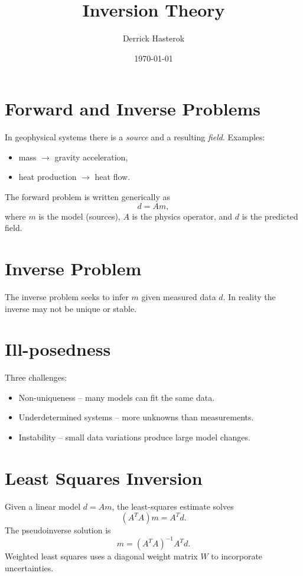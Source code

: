 \documentclass[11pt,a4paper]{article}
\title{Inversion Theory}
\author{Derrick Hasterok}
\date{\today}
\begin{document}
\maketitle

\section{Forward and Inverse Problems}
In geophysical systems there is a \emph{source} and a resulting \emph{field}. Examples:
\begin{itemize}
  \item mass $\rightarrow$ gravity acceleration,
  \item heat production $\rightarrow$ heat flow.
\end{itemize}
The forward problem is written generically as
\begin{equation}
  d = A m ,
\end{equation}
where $m$ is the model (sources), $A$ is the physics operator, and $d$ is the predicted field.

\section{Inverse Problem}
The inverse problem seeks to infer $m$ given measured data $d$. In reality the inverse may not be unique or stable.

\section{Ill-posedness}
Three challenges:
\begin{itemize}
  \item Non-uniqueness -- many models can fit the same data.
  \item Underdetermined systems -- more unknowns than measurements.
  \item Instability -- small data variations produce large model changes.
\end{itemize}

\section{Least Squares Inversion}
Given a linear model $d = A m$, the least-squares estimate solves
\begin{equation}
  (A^T A) m = A^T d .
\end{equation}
The pseudoinverse solution is
\begin{equation}
  m = (A^T A)^{-1} A^T d .
\end{equation}
Weighted least squares uses a diagonal weight matrix $W$ to incorporate uncertainties.
\end{document}
